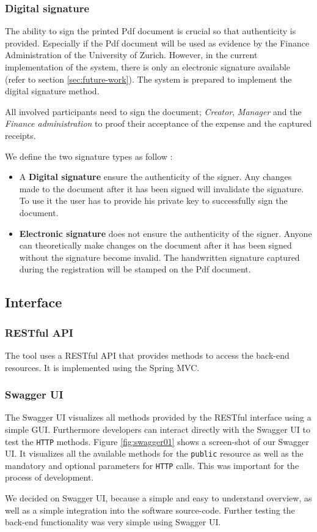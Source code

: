 \subsubsection{Digital signature}
The ability to sign the printed Pdf document is crucial so that authenticity is provided. Especially if the Pdf document will be used as evidence by the Finance Administration of the University of Zurich. However, in the current implementation of the system, there is only an electronic signature available (refer to section \ref{sec:future-work}). The system is prepared to implement the digital signature method. \par

All involved participants need to sign the document; \textit{Creator}, \textit{Manager} and the \textit{Finance administration} to proof their acceptance of the expense and the captured receipts. \par 

We define the two signature types as follow \cite{arx-signature}:
\begin{itemize}
    \item A \textbf{Digital signature} ensure the authenticity of the signer. Any changes made to the document after it has been signed will invalidate the signature. To use it the user has to provide his private key to successfully sign the document.
    \item \textbf{Electronic signature} does not ensure the authenticity of the signer. Anyone can theoretically make changes on the document after it has been signed without the signature become invalid. The handwritten signature captured during the registration will be stamped on the Pdf document.
\end{itemize}

\subsection{Interface}

\subsubsection{RESTful API}
\label{sec:restfulapi}
The tool uses a RESTful API that provides methods to access the back-end resources. It is implemented using the Spring MVC.

\subsubsection{Swagger UI}
The Swagger UI visualizes all methods provided by the RESTful interface using a simple GUI. Furthermore developers can interact directly with the Swagger UI to test the \texttt{HTTP} methods. Figure \ref{fig:swagger01} shows a screen-shot of our Swagger UI. It visualizes all the available methods for the \texttt{public} resource as well as the mandatory and optional parameters for \texttt{HTTP} calls. This was important for the process of development. \cite{swagger} \par
We decided on Swagger UI, because a simple and easy to understand overview, as well as a simple integration into the software source-code. Further testing the back-end functionality was very simple using Swagger UI.

